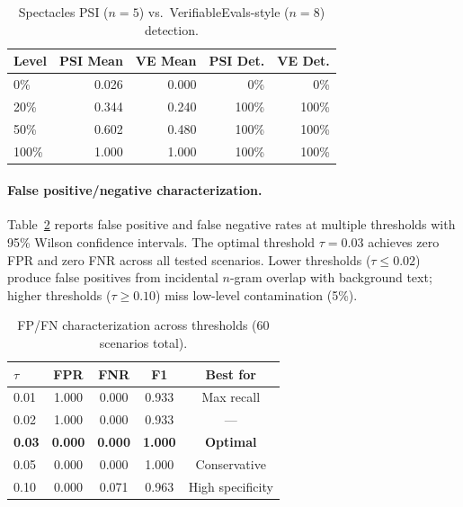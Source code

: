 \documentclass[11pt]{article}
\begin{document}
\begin{table}[t]
\centering
\caption{Spectacles PSI ($n=5$) vs.\ VerifiableEvals-style ($n=8$) detection.}
\label{tab:ve-comparison}
\smallskip
\begin{tabular}{@{}lrrrr@{}}
\toprule
\textbf{Level} & \textbf{PSI Mean} & \textbf{VE Mean} & \textbf{PSI Det.} & \textbf{VE Det.} \\
\midrule
0\%   & 0.026 & 0.000 & 0\%   & 0\% \\
20\%  & 0.344 & 0.240 & 100\% & 100\% \\
50\%  & 0.602 & 0.480 & 100\% & 100\% \\
100\% & 1.000 & 1.000 & 100\% & 100\% \\
\bottomrule
\end{tabular}
\end{table}

\paragraph{False positive/negative characterization.}
Table~\ref{tab:fpfn} reports false positive and false negative rates
at multiple thresholds with 95\% Wilson confidence intervals.
The optimal threshold $\tau = 0.03$ achieves zero FPR and zero FNR
across all tested scenarios.  Lower thresholds ($\tau \leq 0.02$)
produce false positives from incidental $n$-gram overlap with
background text; higher thresholds ($\tau \geq 0.10$) miss low-level
contamination (5\%).

\begin{table}[t]
\centering
\caption{FP/FN characterization across thresholds (60 scenarios total).}
\label{tab:fpfn}
\smallskip
\begin{tabular}{@{}lcccc@{}}
\toprule
$\tau$ & \textbf{FPR} & \textbf{FNR} & \textbf{F1} & \textbf{Best for} \\
\midrule
0.01 & 1.000 & 0.000 & 0.933 & Max recall \\
0.02 & 1.000 & 0.000 & 0.933 & --- \\
\textbf{0.03} & \textbf{0.000} & \textbf{0.000} & \textbf{1.000} & \textbf{Optimal} \\
0.05 & 0.000 & 0.000 & 1.000 & Conservative \\
0.10 & 0.000 & 0.071 & 0.963 & High specificity \\
\bottomrule
\end{tabular}
\end{table}
\end{document}
